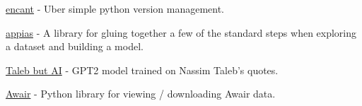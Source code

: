 \begin{cventries}
\vspace{-\baselineskip}

\cventry{}{}{}{}
{
    \begin{cvitems}
    \item \href{https://github.com/aglove2189/encant}{\faLink\acvHeaderIconSep encant}{ - Uber simple python version management.}
    \item \href{https://github.com/aglove2189/appias}{\faLink\acvHeaderIconSep appias}{ - A library for gluing together a few of the standard steps when exploring a dataset and building a model.}
    \item \href{https://twitter.com/taleb_gpt2}{\faTwitter\acvHeaderIconSep Taleb but AI}{ - GPT2 model trained on Nassim Taleb's quotes.}
    \item \href{https://github.com/aglove2189/awair}{\faLink\acvHeaderIconSep Awair}{ - Python library for viewing / downloading Awair data.}
    \end{cvitems}
}

\end{cventries}